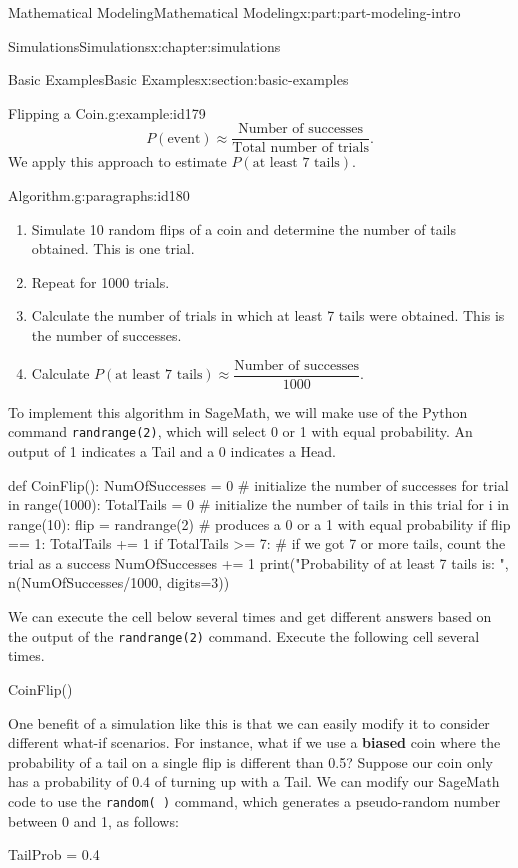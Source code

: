 \documentclass[oneside,10pt,]{book}
\newcommand{\mono}[1]{\texttt{#1}}
\newcommand{\terminology}[1]{\textbf{#1}}
\numberwithin{equation}{section}
\begin{document}
\begin{partptx}{Mathematical Modeling}{}{Mathematical Modeling}{}{}{x:part:part-modeling-intro}
\begin{chapterptx}{Simulations}{}{Simulations}{}{}{x:chapter:simulations}
\begin{sectionptx}{Basic Examples}{}{Basic Examples}{}{}{x:section:basic-examples}
\begin{example}{Flipping a Coin.}{g:example:id179}
%
\begin{equation*}
P(\text{event}) \approx \frac{\text{Number of successes}}{\text{Total number of trials}}.
\end{equation*}
We apply this approach to estimate \(P(\text{at least 7 tails})\).%
\begin{paragraphs}{Algorithm.}{g:paragraphs:id180}%
%
\begin{enumerate}
\item{}Simulate 10 random flips of a coin and determine the number of tails obtained. This is one trial.%
\item{}Repeat for 1000 trials.%
\item{}Calculate the number of trials in which at least 7 tails were obtained. This is the number of successes.%
\item{}Calculate \(P(\text{at least 7 tails})\approx \dfrac{\text{Number of successes}}{1000}\).%
\end{enumerate}
\end{paragraphs}%
\par
To implement this algorithm in SageMath, we will make use of the Python command \mono{randrange(2)}, which will select 0 or 1 with equal probability. An output of 1 indicates a Tail and a 0 indicates a Head.%
\begin{sageinput}
def CoinFlip():
    NumOfSuccesses = 0 # initialize the number of successes
    for trial in range(1000):
        TotalTails = 0 # initialize the number of tails in this trial
        for i in range(10):
            flip = randrange(2) # produces a 0 or a 1 with equal probability
            if flip == 1:
                TotalTails += 1
        if TotalTails >= 7: # if we got 7 or more tails, count the trial as a success
            NumOfSuccesses += 1
    print("Probability of at least 7 tails is: ", n(NumOfSuccesses/1000, digits=3))
\end{sageinput}
We can execute the cell below several times and get different answers based on the output of the \mono{randrange(2)} command. Execute the following cell several times.%
\begin{sageinput}
CoinFlip()
\end{sageinput}
One benefit of a simulation like this is that we can easily modify it to consider different what-if scenarios. For instance, what if we use a \terminology{biased} coin where the probability of a tail on a single flip is different than 0.5? Suppose our coin only has a probability of 0.4 of turning up with a Tail. We can modify our SageMath code to use the \mono{random( )} command, which generates a pseudo-random number between 0 and 1, as follows:%
\begin{sageinput}
TailProb = 0.4


\end{sageinput}
\end{example}
\end{sectionptx}
\end{chapterptx}
\end{partptx}
\end{document}
